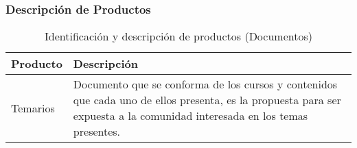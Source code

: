 \newpage
\subsubsection{Descripción de Productos}

\begin{table}[H]
\centering
	\begin{tabular}{p{5cm}|p{11cm}}
		\hline
			\textbf{Producto} & \textbf{Descripción}\\ %
		\hline\hline %
			{Temarios} & {Documento que se conforma de los cursos y contenidos que cada uno de ellos presenta, es la propuesta para ser expuesta a la comunidad interesada en los temas presentes.}\\ %
		\hline
	\end{tabular}
\caption{Identificación y descripción de productos (Documentos)}
\end{table}

